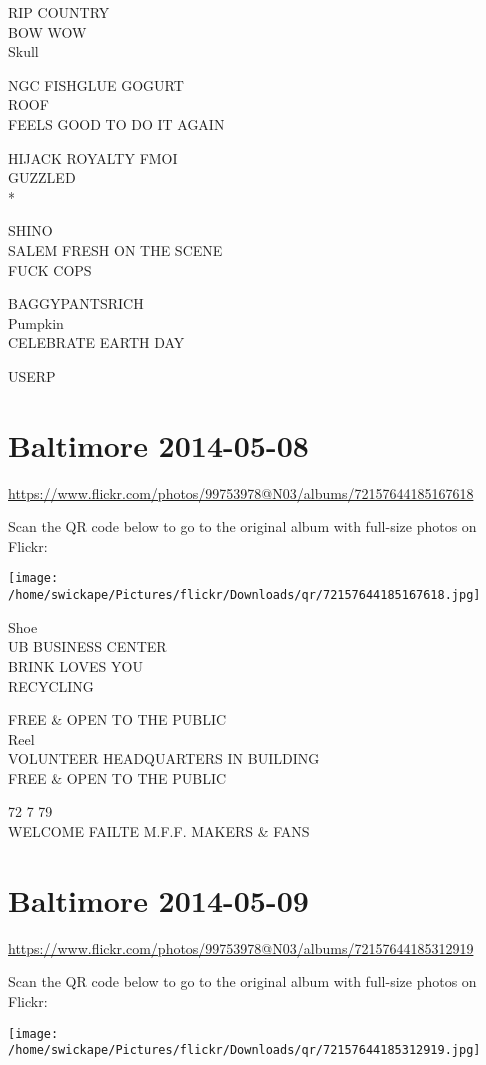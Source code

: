 \documentclass[10pt,letterpaper]{article}
\begin{document}
RIP COUNTRY\\
BOW WOW\\
Skull

NGC FISHGLUE GOGURT\\
ROOF\\
FEELS GOOD TO DO IT AGAIN

HIJACK ROYALTY FMOI\\
GUZZLED\\
*

SHINO\\
SALEM FRESH ON THE SCENE\\
FUCK COPS

BAGGYPANTSRICH\\
Pumpkin\\
CELEBRATE EARTH DAY

USERP


\section*{Baltimore 2014-05-08}

\url{https://www.flickr.com/photos/99753978@N03/albums/72157644185167618}

Scan the QR code below to go to the original album with full-size photos on Flickr:

\texttt{[image: /home/swickape/Pictures/flickr/Downloads/qr/72157644185167618.jpg]}


Shoe\\
UB BUSINESS CENTER\\
BRINK LOVES YOU\\
RECYCLING

FREE \& OPEN TO THE PUBLIC\\
Reel\\
VOLUNTEER HEADQUARTERS IN BUILDING\\
FREE \& OPEN TO THE PUBLIC

72 7 79\\
WELCOME FAILTE M.F.F. MAKERS \& FANS


\section*{Baltimore 2014-05-09}

\url{https://www.flickr.com/photos/99753978@N03/albums/72157644185312919}

Scan the QR code below to go to the original album with full-size photos on Flickr:

\texttt{[image: /home/swickape/Pictures/flickr/Downloads/qr/72157644185312919.jpg]}
\end{document}

